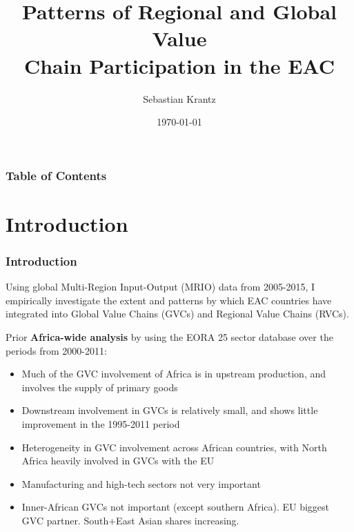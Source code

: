 \documentclass[compress]{beamer}
\title[GVC Participation of EAC Countries]{\textbf{Patterns of Regional and Global Value \\Chain Participation in the EAC}} %
\author{Sebastian Krantz} %
\institute[Kiel Institute for the World Economy]
{
Kiel Institute for the World Economy\\ %
\bigskip
}
\date{\today} %
\newenvironment{noheadline}{
    \setbeamertemplate{headline}{}
    \addtobeamertemplate{frametitle}{\vspace*{-0.9\baselineskip}}{}
}{}
\begin{document}
\begin{noheadline}
\begin{frame} 
\titlepage 
\end{frame}


\begin{frame}
\frametitle{Table of Contents}
\tableofcontents
\end{frame}


\section{Introduction}

\begin{frame}
\frametitle{Introduction}
Using global Multi-Region Input-Output (MRIO) data from 2005-2015, I empirically investigate the extent and patterns by which EAC countries have integrated into Global Value Chains (GVCs) and Regional Value Chains (RVCs). \\ \vspace{2mm}

Prior \textbf{Africa-wide analysis} by \citet{foster2015global} using the EORA 25 sector database over the periods from 2000-2011: \\ %

\begin{itemize} \setlength{\itemsep}{0.5em}
\item Much of the GVC involvement of Africa is in upstream production, and involves the supply of primary goods
\item Downstream involvement in GVCs is relatively small, and shows little improvement in the 1995-2011 period
\item Heterogeneity in GVC involvement across African countries, with North Africa heavily involved in GVCs with the EU
\item Manufacturing and high-tech sectors not very important
\item Inner-African GVCs not important (except southern Africa). EU biggest GVC partner. South+East Asian shares increasing.
\end{itemize}
\end{frame}
\end{noheadline}
\end{document}
